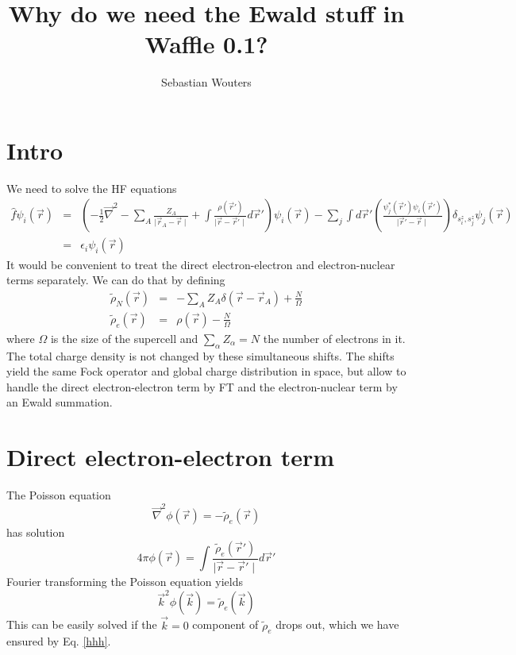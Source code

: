 \documentclass[11pt,a4paper]{article}
\author{Sebastian Wouters}
\title{Why do we need the Ewald stuff in Waffle 0.1?}
\begin{document}
\maketitle
\section{Intro}
We need to solve the HF equations
\begin{eqnarray}
\hat{f} \psi_i(\vec{r}) & = & \left( - \frac{1}{2} \vec{\nabla}^2 - \sum\limits_{A} \frac{Z_A}{\mid \vec{r}_A - \vec{r} \mid} + \int \frac{\rho(\vec{r}')}{\mid \vec{r} - \vec{r}' \mid} d\vec{r}' \right) \psi_i(\vec{r}) - \sum\limits_j \int d\vec{r}' \left( \frac{\psi_j^*(\vec{r}') \psi_i(\vec{r}')}{\mid \vec{r}' - \vec{r} \mid} \right) \delta_{s^z_i,s^z_j} \psi_j(\vec{r})\nonumber\\
& = & \epsilon_i \psi_i(\vec{r})
\end{eqnarray}
It would be convenient to treat the direct electron-electron and electron-nuclear terms separately. We can do that by defining
\begin{eqnarray}
\tilde{\rho}_N(\vec{r}) & = & - \sum\limits_A Z_A \delta(\vec{r} - \vec{r}_A) + \frac{N}{\Omega} \\
\tilde{\rho}_e(\vec{r}) & = & \rho(\vec{r}) - \frac{N}{\Omega} \label{hhh}
\end{eqnarray}
where $\Omega$ is the size of the supercell and $\sum\limits_{\alpha} Z_{\alpha} = N$ the number of electrons in it. The total charge density is not changed by these simultaneous shifts. The shifts yield the same Fock operator and global charge distribution in space, but allow to handle the direct electron-electron term by FT and the electron-nuclear term by an Ewald summation.

\section{Direct electron-electron term}
The Poisson equation
\begin{equation}
\vec{\nabla}^2 \phi(\vec{r}) = - \tilde{\rho}_e(\vec{r})
\end{equation}
has solution
\begin{equation}
4 \pi \phi(\vec{r}) = \int \frac{\tilde{\rho}_e(\vec{r}')}{\mid \vec{r} - \vec{r}' \mid} d\vec{r}'
\end{equation}
Fourier transforming the Poisson equation yields
\begin{equation}
\vec{k}^2 \phi(\vec{k}) = \tilde{\rho}_e(\vec{k})
\end{equation}
This can be easily solved if the $\vec{k} = 0$ component of $\tilde{\rho}_e$ drops out, which we have ensured by Eq. \eqref{hhh}.
\end{document}

